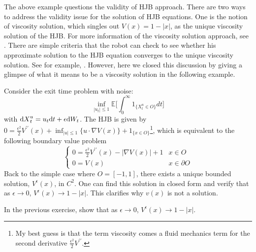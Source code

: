\documentclass[11pt]{book}
\newcommand{\dt}{\text{\normalfont d}t}
\newcommand{\dX}{\text{\normalfont d}X}
\newcommand{\dW}{\text{\normalfont d}W}
\begin{document}
The above example questions the validity of HJB approach. There are two ways to address the validity issue for the solution of HJB equations. One is the notion of viscosity solution, which singles out $V(x)=1-|x|$, as the unique viscosity solution of the HJB. For more information of the viscosity solution approach, see \cite{CIL92}. There are simple criteria that the robot can check to see whether his approximate solution to the HJB equation converges to the unique viscosity solution. See for example, \cite{Barles-Souganidis91}. However, here we closed this discussion by giving a glimpse of what it means to be a viscosity solution in the following example.
\begin{eg}
Consider the exit time problem with noise:
    \begin{equation}
        \inf_{|u_t|\le 1}\mathbb{E}\Big[\int_0^\infty 1_{\{X^u_t\in O\}} dt\Big]
    \end{equation}
with    ${\dX}_t^u=u_t{\dt}+\epsilon\dW_t$.
The HJB is given by 
$0=\frac{\epsilon^2}{2}V^{\prime\prime}(x)+\inf_{|u|\le 1}\{u\cdot \nabla V(x)\}+1_{\{x\in O\}}$\footnote{My best guess is that the term viscosity comes a fluid mechanics term for the second derivative $\frac{\epsilon^2}{2}V^{\prime\prime}$.}, which is equivalent to the following boundary value problem
   \begin{equation}
   \begin{cases}
       0=\frac{\epsilon^2}{2}V^{\prime\prime}(x)-|\nabla V(x)|+1& x\in O\\
       0=V(x)& x\in\partial O
   \end{cases}
   \end{equation}
Back to the simple case where $O=[-1,1]$, there exists a unique bounded solution, $V^{\epsilon}(x)$, in $C^2$. One can find this solution in closed form and verify that as $\epsilon\to 0$, $V^{\epsilon}(x)\to 1-|x|$. This clarifies why $v(x)$ is not a solution.
\end{eg}
\begin{ex}
     In the previous exercise, show that as $\epsilon\to 0$, $V^{\epsilon}(x)\to 1-|x|$.  
\end{ex}

\end{document}
